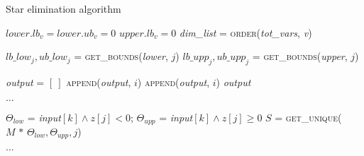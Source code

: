 \begin{algorithm}[t]
	\caption{Star elimination algorithm}
	\label{alg:prop_v2}
	\begin{algorithmic}[1]
		\State $lower.lb_v = lower.ub_v = 0$
		\State $upper.lb_v = 0$
		\State \emph{dim\_list} = \textsc{order}(\emph{tot\_vars}, \emph{v})
		
		\State $lb\_low_j, ub\_low_j$ = \textsc{get\_bounds}(\emph{lower}, $j$)
		\State $lb\_upp_j, ub\_upp_j$ = \textsc{get\_bounds}(\emph{upper}, $j$)
		
		\State {}
		\EndIf
		\EndFor
		
		\State {}
		\EndFunction
		
		\item[]
		
		\State \emph{output} = $[\:]$
		\State \textsc{append}(\emph{output}, $i$)
		\EndFor
		\State \textsc{append}(\emph{output}, $i$)
		\EndFor
		\State \Return \emph{output}
		\EndFunction
		
		\item[]
		
		
		$\ldots$
		
		\State $\Theta_{low}$ = \emph{input}$[k] \wedge z[j] < 0$;
		\hspace{1ex}$\Theta_{upp}$ = \emph{input}$[k] \wedge z[j] \geq 0$
		\State $S$ = \textsc{get\_unique}($M \mbox{ * } \Theta_{low}, \Theta_{upp}, j$)
		\EndIf
		
		$\ldots$
		
		\EndFunction
	\end{algorithmic}
\end{algorithm}

